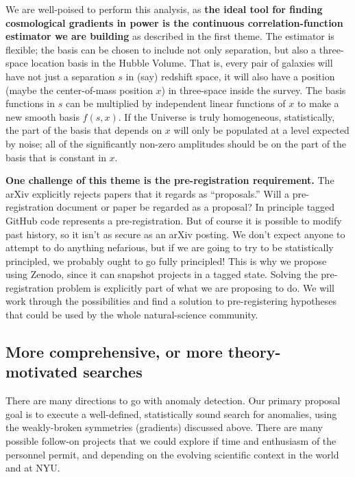 \documentclass[12pt, fullpage, letterpaper]{article}
\newcommand{\KSF}[1]{}
\begin{document}
\noindent
We are well-poised to perform this analysis, as \textbf{the ideal tool for
  finding cosmological gradients in power is the continuous
  correlation-function estimator we are building} as described in the first theme.
The estimator is flexible; the basis can be chosen to include not only separation, 
but also a three-space location basis in the Hubble
Volume. That is, every pair of galaxies will have not just a
separation $s$ in (say) redshift space, it will also have a position
(maybe the center-of-mass position $x$) in three-space inside the
survey.
The basis functions in $s$ can be
multiplied by independent linear functions of
$x$ to make a new smooth basis $f(s,x)$. If the Universe is truly
homogeneous, statistically, the part of the basis that depends on $x$
will only be populated at a level expected by noise; all of the
significantly non-zero amplitudes should be on the part of the basis
that is constant in $x$.

\textbf{One challenge of this theme is the pre-registration requirement.}
The arXiv explicitly rejects papers that it regards as ``proposals.'' Will a
pre-registration document or paper be regarded as a proposal? In principle
tagged GitHub code represents a pre-registration. But of course it is possible
to modify past history, so it isn't as secure as an arXiv posting.
We don't expect anyone to attempt to do anything nefarious, but if we are
going to try to be statistically principled, we probably ought to go fully principled!
This is why we propose using Zenodo, since it can snapshot projects in a tagged
state.
Solving the pre-registration problem is explicitly part of what we are proposing to do.
We will work through the possibilities
and find a solution to pre-registering hypotheses that could be used by the whole natural-science
community.
\KSF{I understand why this paragraph is written so speculatively but that does make it weak. I think some ordering and language changes would strenghthen it while still emphasizing that part of the proposal is figuring out how to do this.}

\subsection{More comprehensive, or more theory-motivated searches}

There are many directions to go with anomaly detection.
Our primary proposal goal is to execute a well-defined, statistically sound search for anomalies, using the weakly-broken symmetries (gradients) discussed above.
There are many possible follow-on projects that we could explore if time and enthusiasm of the personnel permit, and depending on the evolving scientific context in the world and at NYU.
\end{document}
